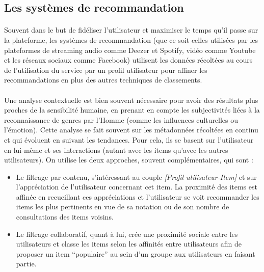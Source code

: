\documentclass[soumission]{ir}
\begin{document}
\subsection{Les systèmes de recommandation}
\paragraph{}
Souvent dans le but de fidéliser l’utilisateur et maximiser le temps qu’il passe sur la plateforme, les 
systèmes de recommandation (que ce soit celles utilisées par les plateformes de streaming audio comme Deezer 
et Spotify, vidéo comme Youtube et les réseaux sociaux comme Facebook) utilisent les données récoltées au 
cours de l’utilisation du service par un profil utilisateur pour affiner les recommandations en plus des 
autres techniques de classements.

\paragraph{}
Une analyse contextuelle est bien souvent nécessaire pour avoir des résultats plus proches de la sensibilité 
humaine, en prenant en compte les subjectivités liées à la reconnaissance de genres par l’Homme (comme les 
influences culturelles ou l’émotion). Cette analyse se fait souvent sur les métadonnées récoltées en continu 
et qui évoluent en suivant les tendances. Pour cela, ils se basent sur l’utilisateur en lui-même et ses 
interactions (autant avec les items qu’avec les autres utilisateurs). On utilise les deux approches, souvent 
complémentaires, qui sont : 
\begin{itemize}
    \item{Le filtrage par contenu, s'intéressant au couple \textit{[Profil utilisateur-Item]} et sur l’appréciation 
    de l’utilisateur concernant cet item. La proximité des items est affinée en recueillant ces appréciations 
    et l’utilisateur se voit recommander les items les plus pertinents en vue de sa notation ou de son 
    nombre de consultations des items voisins.}
    \\
    \item{Le filtrage collaboratif, quant à lui, crée une proximité sociale entre les utilisateurs et classe 
    les items selon les affinités entre utilisateurs afin de proposer un item “populaire” au sein d’un 
    groupe aux utilisateurs en faisant partie.}
\end{itemize}
\end{document}

